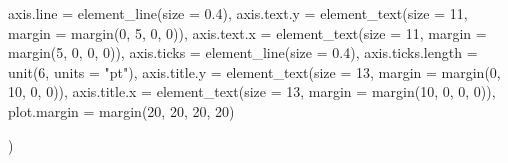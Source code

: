 \documentclass[
  11pt,
]{article}
\newenvironment{Shaded}{\begin{snugshade}}{\end{snugshade}}
\newcommand{\AttributeTok}[1]{\textcolor[rgb]{0.77,0.63,0.00}{#1}}
\newcommand{\DecValTok}[1]{\textcolor[rgb]{0.00,0.00,0.81}{#1}}
\newcommand{\FloatTok}[1]{\textcolor[rgb]{0.00,0.00,0.81}{#1}}
\newcommand{\FunctionTok}[1]{\textcolor[rgb]{0.00,0.00,0.00}{#1}}
\newcommand{\NormalTok}[1]{#1}
\newcommand{\StringTok}[1]{\textcolor[rgb]{0.31,0.60,0.02}{#1}}
\begin{document}
\begin{Shaded}
\begin{Highlighting}[]
    \AttributeTok{axis.line =} \FunctionTok{element\_line}\NormalTok{(}\AttributeTok{size =} \FloatTok{0.4}\NormalTok{),}
    \AttributeTok{axis.text.y =} \FunctionTok{element\_text}\NormalTok{(}\AttributeTok{size =} \DecValTok{11}\NormalTok{, }\AttributeTok{margin =} \FunctionTok{margin}\NormalTok{(}\DecValTok{0}\NormalTok{, }\DecValTok{5}\NormalTok{, }\DecValTok{0}\NormalTok{, }\DecValTok{0}\NormalTok{)),}
    \AttributeTok{axis.text.x =} \FunctionTok{element\_text}\NormalTok{(}\AttributeTok{size =} \DecValTok{11}\NormalTok{, }\AttributeTok{margin =} \FunctionTok{margin}\NormalTok{(}\DecValTok{5}\NormalTok{, }\DecValTok{0}\NormalTok{, }\DecValTok{0}\NormalTok{, }\DecValTok{0}\NormalTok{)),}
    \AttributeTok{axis.ticks =} \FunctionTok{element\_line}\NormalTok{(}\AttributeTok{size =} \FloatTok{0.4}\NormalTok{),}
    \AttributeTok{axis.ticks.length =} \FunctionTok{unit}\NormalTok{(}\DecValTok{6}\NormalTok{, }\AttributeTok{units =} \StringTok{"pt"}\NormalTok{),}
    \AttributeTok{axis.title.y =} \FunctionTok{element\_text}\NormalTok{(}\AttributeTok{size =} \DecValTok{13}\NormalTok{, }\AttributeTok{margin =} \FunctionTok{margin}\NormalTok{(}\DecValTok{0}\NormalTok{, }\DecValTok{10}\NormalTok{, }\DecValTok{0}\NormalTok{, }\DecValTok{0}\NormalTok{)),}
    \AttributeTok{axis.title.x =} \FunctionTok{element\_text}\NormalTok{(}\AttributeTok{size =} \DecValTok{13}\NormalTok{, }\AttributeTok{margin =} \FunctionTok{margin}\NormalTok{(}\DecValTok{10}\NormalTok{, }\DecValTok{0}\NormalTok{, }\DecValTok{0}\NormalTok{, }\DecValTok{0}\NormalTok{)),}
    \AttributeTok{plot.margin =} \FunctionTok{margin}\NormalTok{(}\DecValTok{20}\NormalTok{, }\DecValTok{20}\NormalTok{, }\DecValTok{20}\NormalTok{, }\DecValTok{20}\NormalTok{)}
    
\NormalTok{  )}
\end{Highlighting}
\end{Shaded}
\end{document}
